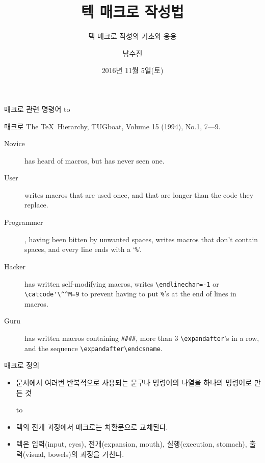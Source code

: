 \documentclass{beamer}
\title{텍 매크로 작성법}
\subtitle{텍 매크로 작성의 기초와 응용}
\author{남수진}
\date{2016년 11월 5일(토)}
\institute{
  2016 공주대학교 문서작성 워크숍 2016\\
  공주대학교 인문사회과학관 1층 컴퓨터실 107호}
\begin{document}
\maketitle


%
\begin{frame}{매크로 관련 명령어}
  \vspace{4mm}
  \hbox to
\end{frame}


%
\begin{frame}[fragile]{매크로}
  The \TeX\ Hierarchy, TUGboat, Volume 15 (1994), No.1, 7---9.
  \begin{description}
  \item [Novice] has heard of macros, but has never seen one.
  \item [User] writes macros that are used once, and that are
    longer than the code they replace.
  \item [Programmer], having been bitten by unwanted spaces,
    writes macros that don't contain spaces, and every line ends with
    a `{\small\verb+%+}'.
  \item [Hacker] has written self-modifying macros, writes
    {\small\verb+\endlinechar=-1+} or {\small\verb+\catcode'\^^M=9+}
    to prevent having to put {\small\verb+%+}'s at the end of lines in macros.
  \item [Guru] has written macros containing {\small\verb+####+}, more than 3
    {\small\verb+\expandafter+}'s in a row, and the sequence
    {\small\verb+\expandafter\endcsname+}.
  \end{description}
\end{frame}


%
\begin{frame}[fragile]{매크로 정의}
  \begin{itemize}
  \item 문서에서 여러번 반복적으로 사용되는 문구나 명령어의 나열을 하나의 명령어로 만든 것
    
    \medskip
    \hbox to
    \medskip
  \item 텍의 전개 과정에서 매크로는 치환문으로 교체된다.
  \item 텍은 입력(input, eyes), 전개(expansion, mouth),
    실행(execution, stomach), 출력(visual, bowels)의 과정을 거친다.
  \end{itemize}
\end{frame}
\end{document}
